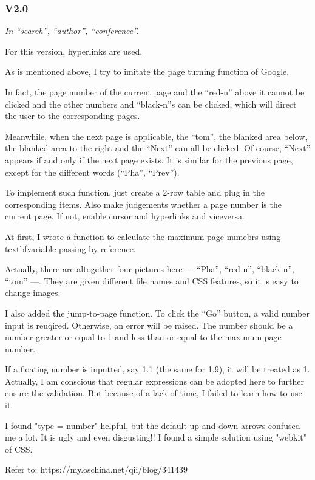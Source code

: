 \documentclass[10pt,twoside,a4paper,titlepage]{article}
\begin{document}
	\subsubsection{V2.0}
		\emph{In “search”, “author”, “conference”.}\par
		For this version, hyperlinks are used.\newline\par
		As is mentioned above, I try to imitate the page turning function of Google.\par
		In fact, the page number of the current page and the “red-n” above it cannot be clicked and the other numbers and “black-n”s can be clicked, which will direct the user to the corresponding pages.\par
		Meanwhile, when the next page is applicable, the “tom”, the blanked area below, the blanked area to the right and the “Next” can all be clicked. Of course, “Next” appears if and only if the next page exists. It is similar for the previous page, except for the different words (“Pha”, “Prev”).\par
		To implement such function, just create a 2-row table and plug in the corresponding items. Also make judgements whether a page number is the current page. If not, enable cursor and hyperlinks and viceversa.\par
		At first, I wrote a function to calculate the maximum page numebrs using textbf{variable-passing-by-reference}.\par
		Actually, there are altogether four pictures here --- “Pha”, “red-n”, “black-n”, “tom” ---. They are given different file names and CSS features, so it is easy to change images.\newline\par
		I also added the jump-to-page function. To click the “Go” button, a valid number input is reuqired. Otherwise, an error will be raised. The number should be a number greater or equal to 1 and less than or equal to the maximum page number.\par
		If a floating number is inputted, say 1.1 (the same for 1.9), it will be treated as 1. Actually, I am conscious that regular expressions can be adopted here to further ensure the validation. But because of a lack of time, I failed to learn how to use it.\par
		I found "type = number" helpful, but the default up-and-down-arrows confused me a lot. It is ugly and even disgusting!! I found a simple solution using "webkit" of CSS.\par
		Refer to: https://my.oschina.net/qii/blog/341439\newline\par
\end{document}

